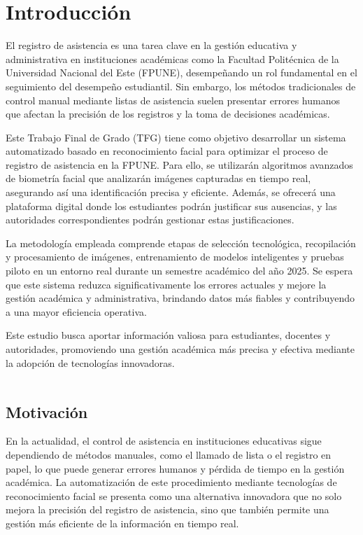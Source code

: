 \fancyhead{}
\fancyfoot{}
\cfoot{\thepage}

\chapter{Introducción}

El registro de asistencia es una tarea clave en la gestión educativa y administrativa en instituciones académicas como la Facultad Politécnica de la Universidad Nacional del Este (FPUNE), desempeñando un rol fundamental en el seguimiento del desempeño estudiantil. Sin embargo, los métodos tradicionales de control manual mediante listas de asistencia suelen presentar errores humanos que afectan la precisión de los registros y la toma de decisiones académicas.

Este Trabajo Final de Grado (TFG) tiene como objetivo desarrollar un sistema automatizado basado en reconocimiento facial para optimizar el proceso de registro de asistencia en la FPUNE. Para ello, se utilizarán algoritmos avanzados de biometría facial que analizarán imágenes capturadas en tiempo real, asegurando así una identificación precisa y eficiente. Además, se ofrecerá una plataforma digital donde los estudiantes podrán justificar sus ausencias, y las autoridades correspondientes podrán gestionar estas justificaciones.

La metodología empleada comprende etapas de selección tecnológica, recopilación y procesamiento de imágenes, entrenamiento de modelos inteligentes y pruebas piloto en un entorno real durante un semestre académico del año 2025. Se espera que este sistema reduzca significativamente los errores actuales y mejore la gestión académica y administrativa, brindando datos más fiables y contribuyendo a una mayor eficiencia operativa.

Este estudio busca aportar información valiosa para estudiantes, docentes y autoridades, promoviendo una gestión académica más precisa y efectiva mediante la adopción de tecnologías innovadoras.
\begin{table}[]
\begin{tabular}{lllll}
\end{tabular}
\end{table}
\section{Motivación}
En la actualidad, el control de asistencia en instituciones educativas sigue dependiendo de métodos manuales, como el llamado de lista o el registro en papel, lo que puede generar errores humanos y pérdida de tiempo en la gestión académica. La automatización de este procedimiento mediante tecnologías de reconocimiento facial se presenta como una alternativa innovadora que no solo mejora la precisión del registro de asistencia, sino que también permite una gestión más eficiente de la información en tiempo real.

